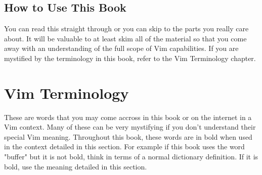 \documentclass[12pt, oneside]{book}
\begin{document}
\section{How to Use This Book}
You can read this straight through or you can skip to the parts you really care about.  It will be valuable to at least skim all of the material so that you come away with an understanding of the full
scope of Vim capabilities.  If you are mystified by the terminology in this book, refer to the Vim Terminology chapter.

\chapter{Vim Terminology}
These are words that you may come accross in this book or on the internet in a Vim context.  Many of these can be very mystifying if you don't understand their special Vim meaning.  Throughout this
book, these words are in bold when used in the context detailed in this section.  For example if this book uses the word "buffer" but it is not bold, think in terms of a normal dictionary definition.
If it is bold, use the meaning detailed in this section.
\end{document}

